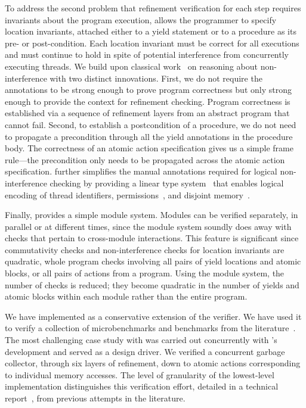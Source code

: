 To address the second problem that refinement verification for each step requires invariants about the program execution, 
\civl allows the programmer to specify location invariants, attached either to a yield statement
or to a procedure as its pre- or post-condition. 
Each location invariant must be correct for all executions and must continue to hold in spite of potential interference from concurrently executing threads.
We build upon classical work~\cite{OwickiG76,Jones83} on reasoning about non-interference
with two distinct innovations.
First, we do not require the annotations to be strong enough to prove program correctness but only strong enough to provide the context for refinement checking. 
Program correctness is established via a sequence of refinement layers from an abstract program that cannot fail.
Second, to establish a postcondition of a procedure, we do not need to propagate a precondition through all the yield annotations in the procedure body. 
The correctness of an atomic action specification gives us a simple frame rule---the precondition only needs to be propagated across the atomic action specification. 
\civl further simplifies the manual annotations required for logical non-interference checking
by providing a linear type system~\cite{Wadler90lineartypes} that enables logical encoding of thread identifiers, permissions~\cite{boyland:03fractions}, 
and disjoint memory~\cite{LahiriQW11}.

Finally, \civl provides a simple module system. Modules can be
verified separately, in parallel or at different times,
since the module system soundly does away with checks that pertain to cross-module interactions. 
This feature is significant since commutativity checks and non-interference checks for location invariants are quadratic, whole program checks involving all pairs of yield locations and atomic blocks, or all pairs of actions from a program. 
Using the module system, the number of checks is reduced; they become quadratic in the number of yields and atomic blocks within each module rather than the entire program. 

We have implemented \civl as a conservative extension of the \boogie verifier.  
We have used it to verify a collection of microbenchmarks and benchmarks from the 
literature~\cite{Blumofe1999,ElmasQT09,ElmasTQ05,FarzanKP14,FlanaganQ03,Herlihy2008}. 
The most challenging case study with \civl was carried out concurrently with \civl's development and served as a design driver. 
We verified a concurrent garbage collector, through six layers of refinement, 
down to atomic actions corresponding to individual memory accesses. 
The level of granularity of the lowest-level implementation distinguishes this verification effort, 
detailed in a technical report~\cite{gc-techreport}, from previous attempts in the literature. 

